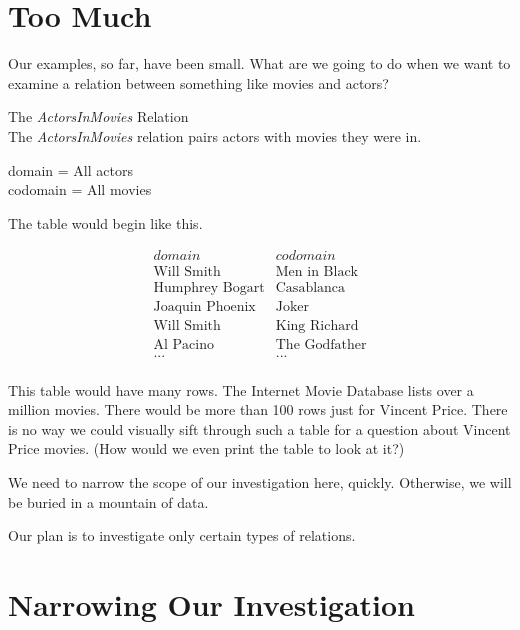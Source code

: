 \documentclass{ximera}
\begin{document}
\section{Too Much}

Our examples, so far, have been small.  What are we going to do when we want to examine a relation between something like movies and actors?  


\begin{example} The \textit{ActorsInMovies} Relation\\
The \textit{ActorsInMovies} relation pairs actors with movies they were in.

domain = All actors \\
codomain = All movies

The table would begin like this.

\[
\begin{array}{l|l}
    domain      & codomain      \\ \hline
    \text{Will Smith}   &  \text{Men in Black} \\
    \text{Humphrey Bogart}   & \text{Casablanca} \\
    \text{Joaquin Phoenix}  &  \text{Joker} \\
    \text{Will Smith}  &  \text{King Richard} \\
    \text{Al Pacino} &  \text{The Godfather} \\ 
    \text{...} &  \text{...} \\ 
\end{array}
\]

\end{example} 


This table would have many rows. The Internet Movie Database lists over a million movies.  There would be more than 100 rows just for Vincent Price. There is no way we could visually sift through such a table for a question about Vincent Price movies. (How would we even print the table to look at it?)

We need to narrow the scope of our investigation here, quickly. Otherwise, we will be buried in a mountain of data.

Our plan is to investigate only certain types of relations.








\section{Narrowing Our Investigation}
\end{document}
